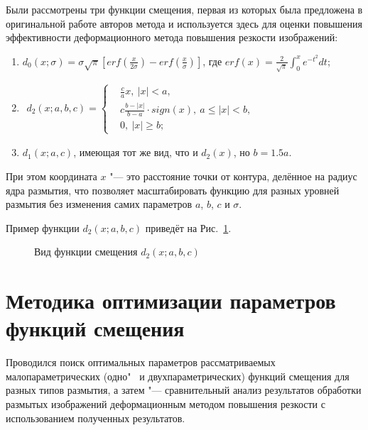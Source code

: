 Были рассмотрены три  функции смещения, первая из которых была предложена в оригинальной работе авторов метода и используется здесь для оценки повышения эффективности деформационного метода повышения резкости изображений:
\begin{enumerate}[beginpenalty=10000]
	\item $d_0\left(x;\sigma\right)=\sigma\sqrt\pi\left[erf\left(\frac{x}{2\sigma}\right)-erf\left(\frac{x}{\sigma}\right)\right]$, где $erf{\left(x\right)}=\frac{2}{\sqrt\pi}\int_{0}^{x}{e^{-t^2}dt}$;
	\item
	$
	\begin{aligned}
		d_2\left(x;a,b,c\right)=\left\{
		\begin{aligned}
			&\frac{c}{a}x,\ \left|x\right|<a,\\
			&c\frac{b-\left|x\right|}{b-a} \cdot sign\left(x\right),\ a\le\left|x\right|<b,\\
			&0,\ \left|x\right|\geq b;
		\end{aligned}
		\right.
	\end{aligned}
	$
	\item $d_1(x;a,c)$, имеющая тот же вид, что и $d_2(x)$, но $b=1.5a$.
\end{enumerate}

При этом координата $x$ "--- это расстояние точки от контура, делённое на радиус ядра размытия, что позволяет масштабировать функцию для разных уровней размытия без изменения самих параметров $a$, $b$, $c$ и $\sigma$.

Пример функции $d_2(x;a,b,c)$ приведёт на Рис.~\ref{fig:warping-d2-example}.

\begin{figure}[ht]
	\caption{Вид функции смещения $d_2(x;a,b,c)$}
	\label{fig:warping-d2-example}
\end{figure}

\section{Методика оптимизации параметров  функций смещения}

Проводился поиск оптимальных параметров рассматриваемых малопараметрических (одно"~ и двухпараметрических)  функций смещения для разных типов размытия, а затем "--- сравнительный анализ результатов обработки размытых изображений деформационным методом повышения резкости с использованием полученных результатов.

